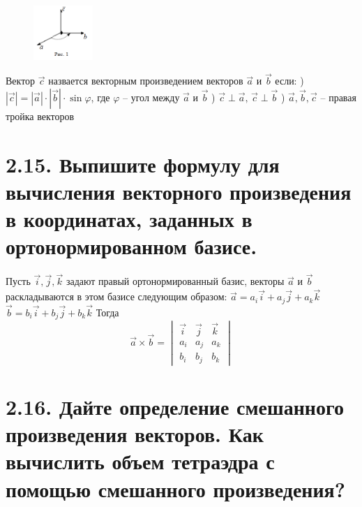\documentclass{article}
\begin{document}
\begin{figure}
    \centering
    \includegraphics[width=0.2\textwidth]{images/right_troika.png}
\end{figure}
Вектор $\vec{c}$ назвается векторным произведением векторов $\vec{a}$ и $\vec{b}$ если:
) $|\vec{c}| = |\vec{a}|\cdot|\vec{b}|\cdot\sin{\varphi}$, где $\varphi$ -- угол между $\vec{a}$ и $\vec{b}$
) $\vec{c} \perp \vec{a},\, \vec{c} \perp \vec{b}$
) $\vec{a}, \vec{b}, \vec{c}$ -- правая тройка векторов

\section*{\LARGE 2.15. Выпишите формулу для вычисления векторного произведения в координатах, заданных в ортонормированном базисе.  }

Пусть $\vec{i}, \vec{j}, \vec{k}$ задают правый ортонормированный базис, векторы $\vec{a}$ и $\vec{b}$ раскладываются в этом базисе следующим образом:
\newline $\vec{a} = a_i\vec{i} + a_j\vec{j} + a_k\vec{k}$
\newline $\vec{b} = b_i\vec{i} + b_j\vec{j} + b_k\vec{k}$
\newline Тогда 
$$\vec{a} \times \vec{b} = 
\begin{vmatrix}
\vec{i} & \vec{j} & \vec{k} \\
a_i & a_j & a_k \\
b_i & b_j & b_k
\end{vmatrix}$$

\section*{\LARGE 2.16. Дайте определение смешанного произведения векторов. Как вычислить объем тетраэдра с помощью смешанного произведения?  }
\end{document}
